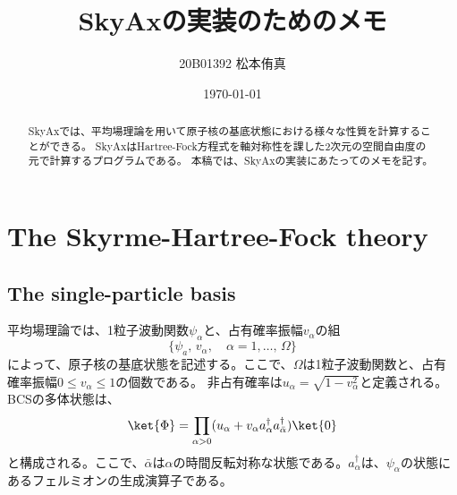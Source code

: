 \documentclass[a4paper,11pt,uplatex]{jsarticle}%
\title{SkyAxの実装のためのメモ}
\author{20B01392 松本侑真}
\date{\today}
\begin{document}
\maketitle
\begin{abstract}
  SkyAxでは、平均場理論を用いて原子核の基底状態における様々な性質を計算することができる。
  SkyAxはHartree-Fock方程式を軸対称性を課した2次元の空間自由度の元で計算するプログラムである。
  本稿では、SkyAxの実装にあたってのメモを記す。
\end{abstract}
\tableofcontents
\newpage
\section{The Skyrme-Hartree-Fock theory}
\subsection*{The single-particle basis}
平均場理論では、1粒子波動関数$\psi_\alpha$と、占有確率振幅$v_{\alpha}$の組
\begin{equation}
  \{\psi_a,\,v_\alpha,\quad\alpha=1,\ldots,\,\Omega\}
\end{equation}
によって、原子核の基底状態を記述する。ここで、$\Omega$は1粒子波動関数と、占有確率振幅$0\leq v_\alpha\leq 1$の個数である。
非占有確率は$u_\alpha=\sqrt{1-v^2_\alpha}$と定義される。BCSの多体状態は、
\begin{equation}
  \ket{\Phi}=\prod_{\alpha>0}(u_\alpha+v_\alpha a^\dagger_\alpha a^{\dagger}_{\bar{\alpha}})\ket{0}
\end{equation}
と構成される。ここで、$\bar{\alpha}$は$\alpha$の時間反転対称な状態である。$a^\dagger_\alpha$は、$\psi_\alpha$の状態にあるフェルミオンの生成演算子である。
\end{document}
